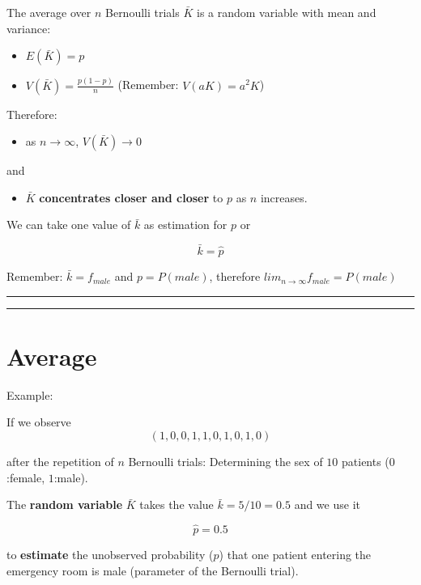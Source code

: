\documentclass[
]{book}
\providecommand{\tightlist}{%
  \setlength{\itemsep}{0pt}\setlength{\parskip}{0pt}}
\begin{document}
The average over \(n\) Bernoulli trials \(\bar{K}\) is a random variable with mean and variance:

\begin{itemize}
\tightlist
\item
  \(E(\bar{K})=p\)
\item
  \(V(\bar{K})=\frac{p(1-p)}{n}\) (Remember: \(V(aK)=a^2K\))
\end{itemize}

Therefore:

\begin{itemize}
\tightlist
\item
  as \(n \rightarrow \infty\), \(V(\bar{K}) \rightarrow 0\)
\end{itemize}

and

\begin{itemize}
\tightlist
\item
  \(\bar{K}\) \textbf{concentrates closer and closer} to \(p\) as \(n\) increases.
\end{itemize}

We can take one value of \(\bar{k}\) as estimation for \(p\) or

\[\bar{k}=\hat{p}\]

Remember: \(\bar{k}=f_{male}\) and \(p=P(male)\), therefore \(lim_{n\rightarrow \infty} f_{male}=P(male)\)

\begin{center}\rule{0.5\linewidth}{0.5pt}\end{center}

\begin{center}\rule{0.5\linewidth}{0.5pt}\end{center}

\hypertarget{average-3}{%
\section{Average}\label{average-3}}

Example:

If we observe \[(1, 0, 0, 1, 1, 0, 1, 0, 1, 0)\]

after the repetition of \(n\) Bernoulli trials: Determining the sex of \(10\) patients (\(0\):female, \(1\):male).

The \textbf{random variable} \(\bar{K}\) takes the value \(\bar{k}= 5/10=0.5\) and we use it

\[\hat{p}=0.5\]

to \textbf{estimate} the unobserved probability (\(p\)) that one patient entering the emergency room is male (parameter of the Bernoulli trial).
\end{document}
